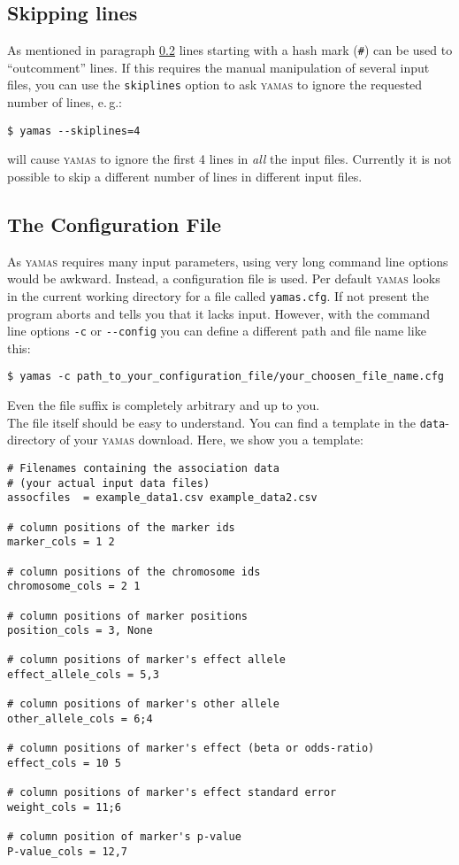 \subsection{Skipping lines}
\label{usage:op:skiplines}
As mentioned in paragraph \ref{usage:op:configfile} lines starting with a hash mark (\verb+#+) can be used to ``outcomment'' lines. If this requires the manual manipulation of several input files, you can use the \verb+skiplines+ option to ask \textsc{yamas} to ignore the requested number of lines, e.\,g.:

\begin{lstlisting}[style=shell]
$ yamas --skiplines=4
\end{lstlisting}
will cause \textsc{yamas} to ignore the first 4 lines in \textit{all} the input files. Currently it is not possible to skip a different number of lines in different input files.


\subsection{The Configuration File}
\label{usage:op:configfile}

As \textsc{yamas} requires many input parameters, using very long command line options would be awkward. Instead, a configuration file is used. Per default \textsc{yamas} looks in the current working directory for a file called \texttt{yamas.cfg}. If not present the program aborts and tells you that  it lacks input. However, with the command line options \verb+-c+ or \verb+--config+ you can define a different path and file name like this:
\begin{lstlisting}[style=shell]
$ yamas -c path_to_your_configuration_file/your_choosen_file_name.cfg
\end{lstlisting}
Even the file suffix is completely arbitrary and up to you.\\

The file itself should be easy to understand. You can find a template in the \texttt{data}-directory of your \textsc{yamas} download. Here, we show you a template:

\begin{lstlisting}[style=Plain]
# Filenames containing the association data
# (your actual input data files)
assocfiles  = example_data1.csv example_data2.csv

# column positions of the marker ids
marker_cols = 1 2

# column positions of the chromosome ids
chromosome_cols = 2 1

# column positions of marker positions
position_cols = 3, None

# column positions of marker's effect allele
effect_allele_cols = 5,3

# column positions of marker's other allele
other_allele_cols = 6;4

# column positions of marker's effect (beta or odds-ratio)
effect_cols = 10 5

# column positions of marker's effect standard error
weight_cols = 11;6

# column position of marker's p-value
P-value_cols = 12,7
\end{lstlisting}

